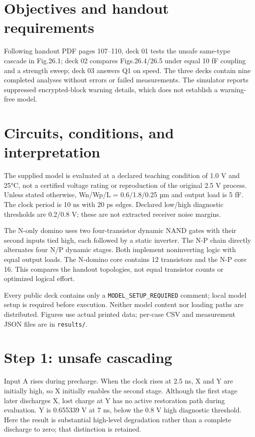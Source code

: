 \section{Objectives and handout requirements}

Following handout PDF pages 107--110, deck 01 tests the unsafe same-type cascade in Fig.26.1; deck 02 compares Figs.26.4/26.5 under equal 10 fF coupling and a strength sweep; deck 03 answers Q1 on speed. The three decks contain nine completed analyses without errors or failed measurements. The simulator reports suppressed encrypted-block warning details, which does not establish a warning-free model.

\section{Circuits, conditions, and interpretation}

The supplied model is evaluated at a declared teaching condition of 1.0 V and 25°C, not a certified voltage rating or reproduction of the original 2.5 V process. Unless stated otherwise, Wn/Wp/L = 0.6/1.8/0.25 µm and output load is 5 fF. The clock period is 10 ns with 20 ps edges. Declared low/high diagnostic thresholds are 0.2/0.8 V; these are not extracted receiver noise margins.

The N-only domino uses two four-transistor dynamic NAND gates with their second inputs tied high, each followed by a static inverter. The N-P chain directly alternates four N/P dynamic stages. Both implement noninverting logic with equal output loads. The N-domino core contains 12 transistors and the N-P core 16. This compares the handout topologies, not equal transistor counts or optimized logical effort.

Every public deck contains only a \texttt{MODEL\_SETUP\_REQUIRED} comment; local model setup is required before execution. Neither model content nor loading paths are distributed. Figures use actual printed data; per-case CSV and measurement JSON files are in \texttt{results/}.

\section{Step 1: unsafe cascading}

Input A rises during precharge. When the clock rises at 2.5 ns, X and Y are initially high, so X initially enables the second stage. Although the first stage later discharges X, lost charge at Y has no active restoration path during evaluation. Y is 0.655339 V at 7 ns, below the 0.8 V high diagnostic threshold. Here the result is substantial high-level degradation rather than a complete discharge to zero; that distinction is retained.


